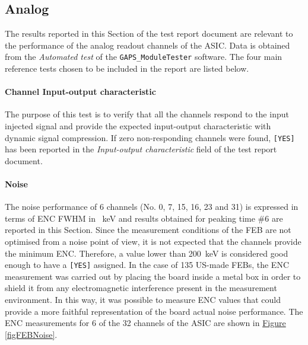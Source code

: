 
\subsection{Analog}
\label{FEBanalogtest}
The results reported in this Section of the test report document are relevant to the performance of the analog readout channels of the ASIC. Data is obtained from the \textit{Automated test} of the \texttt{GAPS\_ModuleTester} software. The four main reference tests chosen to be included in the report are listed below.

\paragraph{Channel Input-output characteristic} The purpose of this test is to verify that all the channels respond to the input injected signal and provide the expected input-output characteristic with dynamic signal compression. If zero non-responding channels were found, \texttt{[YES]} has been reported in the \textit{Input-output characteristic} field of the test report document.

\paragraph{Noise} The noise performance of 6 channels (No. 0, 7, 15, 16, 23 and 31) is expressed in terms of ENC FWHM in \SI{}{\kilo\electronvolt} and results obtained for peaking time \#6 are reported in this Section. Since the measurement conditions of the FEB are not optimised from a noise point of view, it is not expected that the channels provide the minimum ENC. Therefore, a value lower than \SI{200}{\kilo\electronvolt} is considered good enough to have a \texttt{[YES]} assigned. In the case of 135 US-made FEBs, the ENC measurement was carried out by placing the board inside a metal box in order to shield it from any electromagnetic interference present in the measurement environment. In this way, it was possible to measure ENC values that could provide a more faithful representation of the board actual noise performance. The ENC measurements for 6 of the 32 channels of the ASIC are shown in \hyperref[figFEBNoise]{Figure \ref{figFEBNoise}}.


